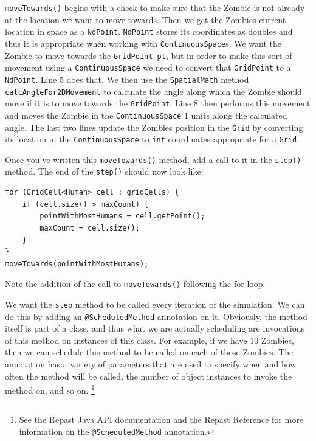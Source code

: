 \documentclass[11pt]{amsart}
\begin{document}
\texttt{moveTowards()} begins with a check to make sure that the Zombie is not already at the location we want to move towards. Then we get the Zombies current location in space as a \texttt{NdPoint}. \texttt{NdPoint} stores its coordinates as doubles and thus it is appropriate when working with \texttt{ContinuousSpace}s. We want the Zombie to move towards the \texttt{GridPoint pt}, but in order to make this sort of movement using a \texttt{ContinuousSpace} we need to convert that \texttt{GridPoint} to a \texttt{NdPoint}. Line 5 does that. We then use the \texttt{SpatialMath} method \texttt{calcAngleFor2DMovement} to calculate the angle along which the Zombie should move if it is to move towards the \texttt{GridPoint}. Line 8 then performs this movement and moves the Zombie in the \texttt{ContinuousSpace} 1 units along the calculated angle. The last two lines update the Zombies position in the \texttt{Grid} by converting its location in the \texttt{ContinuousSpace} to \texttt{int} coordinates appropriate for a \texttt{Grid}.

Once you've written this \texttt{moveTowards()} method, add a call to it in the \texttt{step()} method. The end of the \texttt{step()} should now look like:

\noindent\begin{minipage}[h]{\textwidth}
\vspace{.2in}
\lstset{language=java,caption=Step with MoveTowards Added}
\begin{lstlisting}
for (GridCell<Human> cell : gridCells) {
	if (cell.size() > maxCount) {
		pointWithMostHumans = cell.getPoint();
		maxCount = cell.size();
	}
}
moveTowards(pointWithMostHumans);
\end{lstlisting}
\vspace{.2in}
\end{minipage}
Note the addition of the call to \texttt{moveTowards()} following the for loop.

We want the \texttt{step} method to be called every iteration of the simulation. We can do this by adding an \texttt{@ScheduledMethod} annotation on it. Obviously, the method itself is part of a class, and thus what we are actually scheduling are invocations of this method on instances of this class. For example, if we have 10 Zombies, then we can schedule this method to be called on each of those Zombies. The annotation has a variety of parameters that are used to specify when and how often the method will be called, the number of object instances to invoke the method on, and so on. \footnote{See the Repast Java API documentation and the Repast Reference for more information on the \texttt{@ScheduledMethod} annotation.} 
\end{document}
